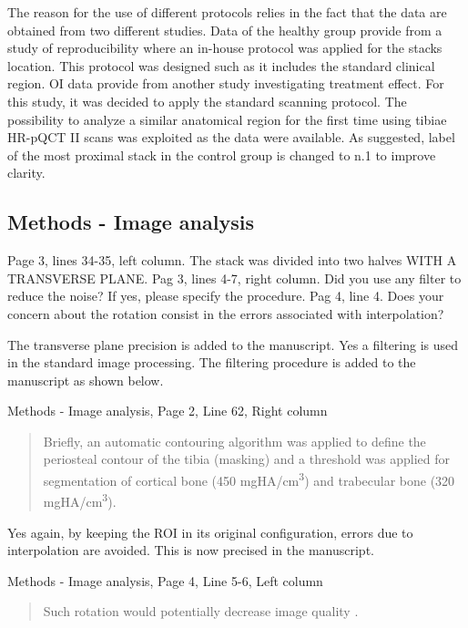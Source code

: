 \documentclass{AR2RC}
\begin{document}
\AR The reason for the use of different protocols relies in the fact that the data are obtained from two different studies. Data of the healthy group provide from a study of reproducibility where an in-house protocol was applied for the stacks location. This protocol was designed such as it includes the standard clinical region. OI data provide from another study investigating treatment effect. For this study, it was decided to apply the standard scanning protocol. The possibility to analyze a similar anatomical region for the first time using tibiae HR-pQCT II scans was exploited as the data were available. As suggested, label of the most proximal stack in the control group is changed to n.1 to improve clarity.

\subsection{Methods - Image analysis}
\RC Page 3, lines 34-35, left column. The stack was divided into two halves WITH A TRANSVERSE PLANE. Pag 3, lines 4-7, right column. Did you use any filter to reduce the noise? If yes, please specify the procedure. Pag 4, line 4. Does your concern about the rotation consist in the errors associated with interpolation?

\AR The transverse plane precision is added to the manuscript. Yes a filtering is used in the standard image processing. The filtering procedure is added to the manuscript as shown below.\par

Methods - Image analysis, Page 2, Line 62, Right column
\begin{quote}
	Briefly, an automatic contouring algorithm was applied to define the periosteal contour of the tibia (masking) and a threshold was applied for segmentation of cortical bone (450 mgHA/cm\textsuperscript{3}) and trabecular bone (320 mgHA/cm\textsuperscript{3}).
\end{quote}

Yes again, by keeping the ROI in its original configuration, errors due to interpolation are avoided. This is now precised in the manuscript.\par

Methods - Image analysis, Page 4, Line 5-6, Left column
\begin{quote}
	Such rotation would potentially decrease image quality .
\end{quote}
\end{document}
